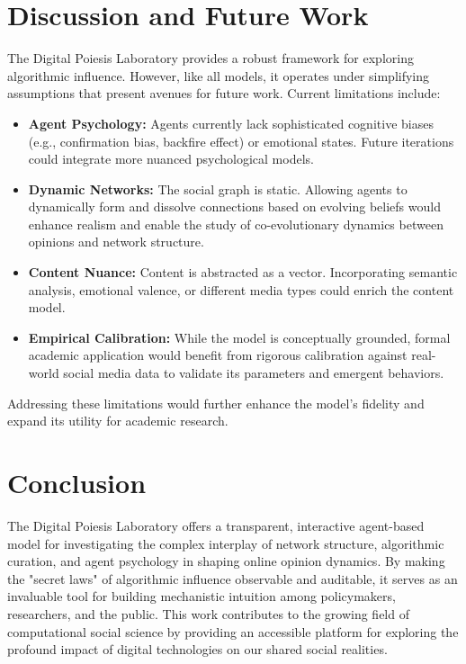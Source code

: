 \documentclass[10pt,a4paper]{article}
\begin{document}
\section{Discussion and Future Work}
\label{sec:discussion}
The Digital Poiesis Laboratory provides a robust framework for exploring algorithmic influence. However, like all models, it operates under simplifying assumptions that present avenues for future work. Current limitations include:
\begin{itemize}
    \item \textbf{Agent Psychology:} Agents currently lack sophisticated cognitive biases (e.g., confirmation bias, backfire effect) or emotional states. Future iterations could integrate more nuanced psychological models.
    \item \textbf{Dynamic Networks:} The social graph is static. Allowing agents to dynamically form and dissolve connections based on evolving beliefs would enhance realism and enable the study of co-evolutionary dynamics between opinions and network structure.
    \item \textbf{Content Nuance:} Content is abstracted as a vector. Incorporating semantic analysis, emotional valence, or different media types could enrich the content model.
    \item \textbf{Empirical Calibration:} While the model is conceptually grounded, formal academic application would benefit from rigorous calibration against real-world social media data to validate its parameters and emergent behaviors.
\end{itemize}
Addressing these limitations would further enhance the model's fidelity and expand its utility for academic research.

\section{Conclusion}
\label{sec:conclusion}
The Digital Poiesis Laboratory offers a transparent, interactive agent-based model for investigating the complex interplay of network structure, algorithmic curation, and agent psychology in shaping online opinion dynamics. By making the "secret laws" of algorithmic influence observable and auditable, it serves as an invaluable tool for building mechanistic intuition among policymakers, researchers, and the public. This work contributes to the growing field of computational social science by providing an accessible platform for exploring the profound impact of digital technologies on our shared social realities.

\end{document}

